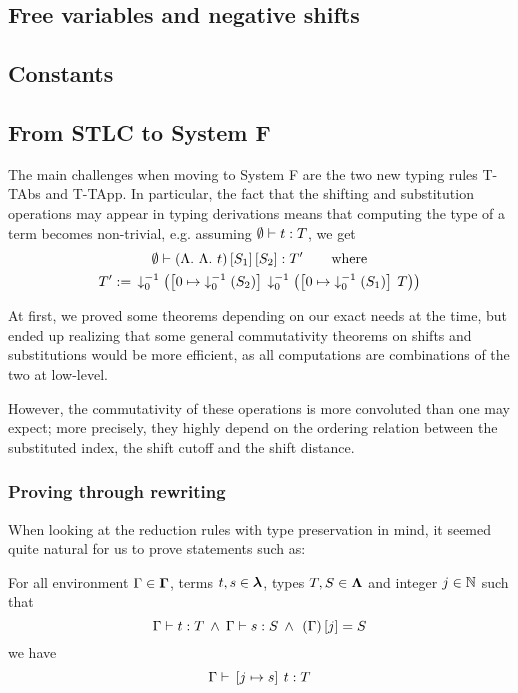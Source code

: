 \subsection{Free variables and negative shifts}


\subsection{Constants}\label{sec:csts}


\subsection{From STLC to System F}
The main challenges when moving to System F are the two new typing rules T-TAbs and T-TApp.
In particular, the fact that the shifting and substitution operations may appear in typing derivations means that computing the type of a term becomes non-trivial, 
e.g. assuming $\emptyset \vdash{} t : {T}$, we get
\begin{gather*}
    \emptyset \vdash{} {\ensuremath{{(\Lambda{}.\ {\Lambda{}.\ {t}})}\left[{S_1}\right]}}\left[{S_2}\right] : {T'} \qquad \textup{where}\\
    T' \mathrel{:=\,} {\downarrow^{-1}_{0}\left({\left[{0} \mapsto{} {{\downarrow^{-1}_{0}\left({S_2}\right)}}\right]\:{
        {\downarrow^{-1}_{0}\left({\left[{0} \mapsto{} {{\downarrow^{-1}_{0}\left({S_1}\right)}}\right]\:{T}}\right)}
    }}\right)}
\end{gather*}

\noindent
At first, we proved some theorems depending on our exact needs at the time,
but ended up realizing that some general commutativity theorems on shifts and substitutions would be more efficient, as all computations are combinations of the two at low-level.

However, the commutativity of these operations is more convoluted than one may expect;
more precisely, they highly depend on the ordering relation between the substituted index, the shift cutoff and the shift distance.

\subsubsection{Proving through rewriting}
When looking at the reduction rules with type preservation in mind,
it seemed quite natural for us to prove statements such as:
\begin{lemma}\label{thm:subst_presevation}
    For all environment $\Gamma \in \bm\Gamma$, terms $t,s \in \bm\lambda$, types $T,S \in \bm\Lambda$ and integer $j \in \mathbb{N}$ such that 
    \[
        \typerel{\Gamma}{t}{T} \mand 
        \typerel{\Gamma}{s}{S} \mand
        \slistindexing{\Gamma}{j} = S
    \]
    we have
    \[ \Gamma \vdash{} \left[{j} \mapsto{} {s}\right]\:{t} : {T} \]
\end{lemma}

